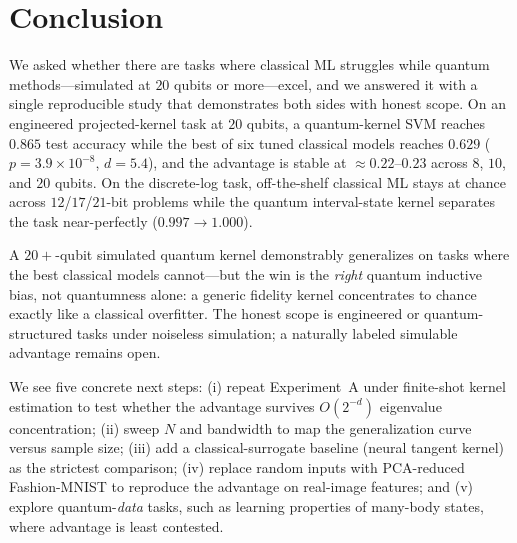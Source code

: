 \section{Conclusion}
\label{sec:conclusion}

We asked whether there are tasks where classical ML struggles while quantum
methods---simulated at $20$ qubits or more---excel, and we answered it with a
single reproducible study that demonstrates both sides with honest scope. On an
engineered projected-kernel task at $20$ qubits, a quantum-kernel SVM reaches
$0.865$ test accuracy while the best of six tuned classical models reaches $0.629$
($p=3.9\times10^{-8}$, $d=5.4$), and the advantage is stable at $\approx
0.22$--$0.23$ across $8$, $10$, and $20$ qubits. On the discrete-log task,
off-the-shelf classical ML stays at chance across $12$/$17$/$21$-bit problems
while the quantum interval-state kernel separates the task near-perfectly
($0.997 \to 1.000$).

 A $20{+}$-qubit simulated quantum kernel demonstrably
generalizes on tasks where the best classical models cannot---but the win is the
\emph{right} quantum inductive bias, not quantumness alone: a generic fidelity
kernel concentrates to chance exactly like a classical overfitter. The honest
scope is engineered or quantum-structured tasks under noiseless simulation; a
naturally labeled simulable advantage remains open.

 We see five concrete next steps: (i) repeat Experiment~A under
finite-shot kernel estimation to test whether the advantage survives $O(2^{-d})$
eigenvalue concentration; (ii) sweep $N$ and bandwidth to map the generalization
curve versus sample size; (iii) add a classical-surrogate baseline (neural tangent
kernel) as the strictest comparison; (iv) replace random inputs with PCA-reduced
Fashion-MNIST to reproduce the advantage on real-image features; and (v) explore
quantum-\emph{data} tasks, such as learning properties of many-body states, where
advantage is least contested.
